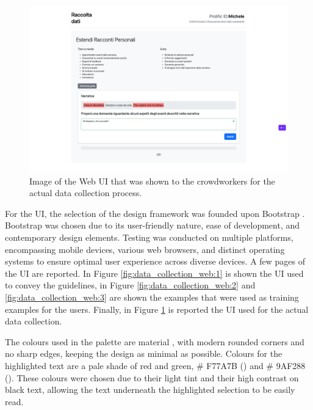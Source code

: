\begin{figure}[!htbp]
    \centering
    \includegraphics[width=1\linewidth]{assets//imgs/UI-datacollection.png}
    \caption{Image of the Web UI that was shown to the crowdworkers for the actual data collection process.}
    \label{fig:data_collection_web:4}
\end{figure}

For the UI, the selection of the design framework was founded upon Bootstrap \cite{bootstrap}. Bootstrap was chosen due to its user-friendly nature, ease of development, and contemporary design elements. Testing was conducted on multiple platforms, encompassing mobile devices, various web browsers, and distinct operating systems to ensure optimal user experience across diverse devices.
A few pages of the UI are reported. In Figure \ref{fig:data_collection_web:1} is shown the UI used to convey the guidelines, in Figure \ref{fig:data_collection_web:2} and \ref{fig:data_collection_web:3} are shown the examples that were used as training examples for the users. Finally, in Figure \ref{fig:data_collection_web:4} is reported the UI used for the actual data collection.

The colours used in the palette are material \cite{material}, with modern rounded corners and no sharp edges, keeping the design as minimal as possible. Colours for the highlighted text are a pale shade of red and green, \# F77A7B (\redbg{\hspace{1em}}) and \# 9AF288 (\greenbg{\hspace{1em}}). These colours were chosen due to their light tint and their high contrast on black text, allowing the text underneath the highlighted selection to be easily read.


